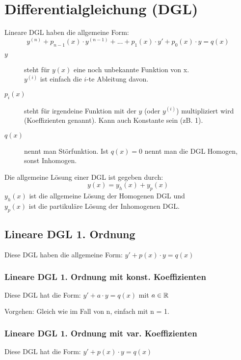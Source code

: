 \section{Differentialgleichung (DGL)}
{\small
Lineare DGL haben die allgemeine Form:
\vspace{-0.2cm}\[
	y^{(n)} + p_{n-1}(x) \cdot y^{(n-1)} + ... + p_1(x) \cdot y' + p_0(x) \cdot y = q(x) 
\]
\begin{description}
	\item [$y$] steht für $y(x)$ eine noch unbekannte Funktion von x.\\
			$y^{(i)}$ ist einfach die $i$-te Ableitung davon.

	\item [$p_i(x)$] steht für irgendeine Funktion mit der $y$ (oder $y^{(i)}$) multipliziert wird (Koeffizienten genannt). Kann auch Konstante sein (zB. 1).

	\item [$q(x)$] nennt man Störfunktion. Ist $q(x) = 0$ nennt man die DGL Homogen, sonst Inhomogen.
\end{description}

Die allgemeine Lösung einer DGL ist gegeben durch:
\vspace{-0.2cm}\[
	y(x) = y_h(x) + y_p(x)
\]
$y_h(x)$ ist die allgemeine Lösung der Homogenen DGL und\\
$y_p(x)$ ist die partikuläre Lösung der Inhomogenen DGL.
}

\subsection{Lineare DGL 1. Ordnung}
\vspace{-0.1cm}Diese DGL haben die allgemeine Form: $y' + p(x) \cdot y = q(x)$

\subsubsection{Lineare DGL 1. Ordnung mit konst. Koeffizienten}
\vspace{-0.1cm}Diese DGL hat die Form: $y' + a \cdot y = q(x)$ mit $a \in \mathbb{R}$

Vorgehen: Gleich wie im Fall von n, einfach mit n = 1.

\subsubsection{Lineare DGL 1. Ordnung mit var. Koeffizienten}
Diese DGL hat die Form: $y' + p(x) \cdot y = q(x)$

